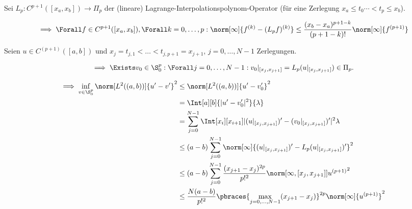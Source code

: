 \begin{solution}

Sei $L_p: C^{p+1}([x_a, x_b]) \to \Pi_p$ der (lineare) Lagrange-Interpolationspolynom-Operator (für eine Zerlegung $x_a \leq t_0 \cdots < t_p \leq x_b$).


\begin{align*}
  \implies
  \Forall f \in C^{p+1}([x_a, x_b]),
  \Forall k = 0, \dots, p:
  \norm[\infty]
  {
    f^{(k)} - (L_p f)^{(k)}
  }
  \leq
  \frac
  {
    (x_b - x_a)^{p+1-k}
  }{
    (p + 1 - k)!
  }
  \norm[\infty]
  {
    f^{(p+1)}
  }
\end{align*}

Seien $u \in C^{(p+1)}([a, b])$ und $x_j = t_{j, 1} < \dots < t_{j, p+1} = x_{j+1}$, $j = 0, \dots, N-1$ Zerlegungen.

\begin{align*}
  \implies
  \Exists v_0 \in \S_0^p:
  \Forall j = 0, \dots, N-1:
  v_0|_{[x_j , x_{j+1}]}
  =
  L_p(u|_{[x_j , x_{j+1}]})
  \in
  \Pi_p.
\end{align*}

\begin{align*}
  \implies
  \inf_{v \in \S^p_0}
  \norm[L^2((a, b))]{u^\prime - v^\prime}^2
  & \leq
  \norm[L^2((a, b))]{u^\prime - v_0^\prime}^2 \\
  & =
  \Int[a][b]
  {|u^\prime - v_0^\prime|^2}
  {\lambda} \\
  & =
  \sum_{j=0}^{N-1}
  \Int[x_i][x_{i+1}]
  {
    |
      (u|_{[x_j , x_{j+1}]})^\prime
      -
      (v_0|_{[x_j , x_{j+1}]})^\prime
    |^2
  }
  {\lambda} \\
  & \leq
  (a - b)
  \sum_{j=0}^{N-1}
  \norm[\infty]
  {
    (u|_{[x_j , x_{j+1}]})^\prime
    -
    L_p(u|_{[x_j , x_{j+1}]})^\prime
  }^2 \\
  & \leq
  (a - b)
  \sum_{j=0}^{N-1}
  \frac
  {
    ({x_{j+1} - x_j})^{2p}
  }{p!^2}
  \norm
  [{\infty, [x_j,x_{j+1}]}]
  {u^{(p+1)}}^2 \\
  & \leq
  \frac{N (a - b)}{p!^2}
  \pbraces
  {
    \max_{j=0, \dots, N-1}
    (x_{j+1} - x_j)
  }^{2p}
  \norm[\infty]{u^{(p+1)}}^2
\end{align*}

\end{solution}


